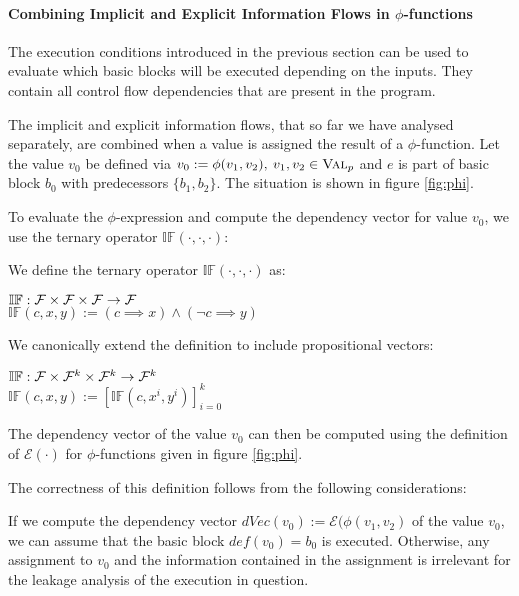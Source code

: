 \paragraph{Combining Implicit and Explicit Information Flows in $\phi$-functions}
The execution conditions introduced in the previous section can be used to evaluate which basic blocks will be executed depending on the inputs. They contain all control flow dependencies that are present in the program.

The implicit and explicit information flows, that so far we have analysed separately, are combined when a value is assigned the result of a $\phi$-function. Let the value $v_0$ be defined via $v_0 := \phi(v_1, v_2), \: v_1, v_2 \in \textsc{Val}_p$ and $e$ is part of basic block $b_0$ with predecessors $\{b_1, b_2\}$. The situation is shown in figure \ref{fig:phi}.

To evaluate the $\phi$-expression and compute the dependency vector for value $v_0$, we use the ternary operator $\mathbb{IF}(\cdot, \cdot, \cdot)$:

\begin{definition}
    We define the ternary operator $\mathbb{IF}(\cdot, \cdot, \cdot)$ as:
    \begin{center}
        $\mathbb{IF}: \mathcal{F} \times \mathcal{F} \times \mathcal{F} \to \mathcal{F}$\\
        $\mathbb{IF}(c, x, y) := (c \implies x) \land (\lnot c \implies y)$
    \end{center}
    We canonically extend the definition to include propositional vectors:
    \begin{center}
        $\mathbb{IF}: \mathcal{F} \times \mathcal{F}^k \times \mathcal{F}^k \to \mathcal{F}^k$\\
        $\mathbb{IF}(c, x, y) := [\mathbb{IF}(c, x^i, y^i)]_{i = 0}^k$
    \end{center}
\end{definition}

The dependency vector of the value $v_0$ can then be computed using the definition of $\mathcal{E}(\cdot)$ for $\phi$-functions given in figure \ref{fig:phi}.

The correctness of this definition follows from the following considerations:

If we compute the dependency vector $dVec(v_0) := \mathcal{E}(\phi(v_1, v_2)$ of the value $v_0$, we can assume that the basic block $def(v_0) = b_0$ is executed. Otherwise, any assignment to $v_0$ and the information contained in the assignment is irrelevant for the leakage analysis of the execution in question.

